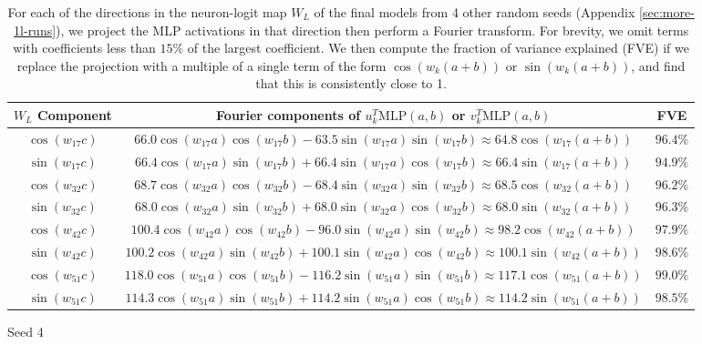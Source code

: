 \documentclass{article} %
\newcommand{\cosp}[1]{\cos \left ( #1 \right )}
\newcommand{\sinp}[1]{\sin \left ( #1 \right )}
\newcommand{\MLP}{\textrm{MLP}}
\begin{document}
\begin{table}[]
    \begin{subtable}{1\textwidth}
    \centering
        \begin{tabular}{c|c|c}
         $W_{L}$ Component & Fourier components of $u_k^T \MLP(a,b)$ or $v_k^T \MLP(a,b)$& FVE\\
         \hline 
        $\cosp{w_{17}c}$ & $66.0 \cosp{w_{17}a}\cosp{w_{17}b} -63.5 \sinp{w_{17}a}\sinp{w_{17}b}\approx 64.8  \cosp{w_{17}(a+b)} $& $96.4 \%$ \\
$\sinp{w_{17}c}$ & $66.4 \cosp{w_{17}a}\sinp{w_{17}b} + 66.4 \sinp{w_{17}a}\cosp{w_{17}b}\approx 66.4  \sinp{w_{17}(a+b)} $& $94.9 \%$ \\
$\cosp{w_{32}c}$ & $68.7 \cosp{w_{32}a}\cosp{w_{32}b} -68.4 \sinp{w_{32}a}\sinp{w_{32}b}\approx 68.5  \cosp{w_{32}(a+b)} $& $96.2 \%$ \\
$\sinp{w_{32}c}$ & $68.0 \cosp{w_{32}a}\sinp{w_{32}b} + 68.0 \sinp{w_{32}a}\cosp{w_{32}b}\approx 68.0  \sinp{w_{32}(a+b)} $& $96.3 \%$ \\
$\cosp{w_{42}c}$ & $100.4 \cosp{w_{42}a}\cosp{w_{42}b} -96.0 \sinp{w_{42}a}\sinp{w_{42}b}\approx 98.2  \cosp{w_{42}(a+b)} $& $97.9 \%$ \\
$\sinp{w_{42}c}$ & $100.2 \cosp{w_{42}a}\sinp{w_{42}b} + 100.1 \sinp{w_{42}a}\cosp{w_{42}b}\approx 100.1  \sinp{w_{42}(a+b)} $& $98.6 \%$ \\
$\cosp{w_{51}c}$ & $118.0 \cosp{w_{51}a}\cosp{w_{51}b} -116.2 \sinp{w_{51}a}\sinp{w_{51}b}\approx 117.1  \cosp{w_{51}(a+b)} $& $99.0 \%$ \\
$\sinp{w_{51}c}$ & $114.3 \cosp{w_{51}a}\sinp{w_{51}b} + 114.2 \sinp{w_{51}a}\cosp{w_{51}b}\approx 114.2  \sinp{w_{51}(a+b)} $& $98.5 \%$ \\
    \end{tabular}
    \caption{Seed 4}
    \end{subtable}
    
    \caption{For each of the directions in the neuron-logit map $W_L$ of the final models from 4 other random seeds (Appendix \ref{sec:more-1l-runs}), we project the MLP activations in that direction then perform a Fourier transform. For brevity, we omit terms with coefficients less than $15\%$ of the largest coefficient. We then compute the fraction of variance explained (FVE) if we replace the projection with a multiple of a single term of the form $\cosp{w_k(a+b)}$ or $\sinp{w_k(a+b)}$, and find that this is consistently close to 1.}
    \label{tab:mlp-projections-seed-1}
\end{table}
\end{document}
